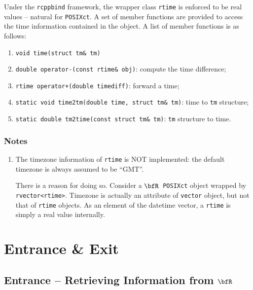 \documentclass{article}
\newcommand{\R}{$\bfR$}
\begin{document}
Under the \texttt{rcppbind} framework, the wrapper class
\texttt{rtime} is enforced to be real values -- natural for
\texttt{POSIXct}. A set of member functions are provided to
access the time information contained in the object. A list
of member functions is as follows:
\begin{enumerate}
  \item \texttt{void time(struct tm\& tm)} 
  \item \texttt{double operator-(const rtime\& obj)}: compute the time difference;
  \item \texttt{rtime operator+(double timediff)}: forward a time;
  \item \texttt{static void time2tm(double time, struct tm\&
    tm)}: time to \texttt{tm} structure;
  \item \texttt{static double tm2time(const struct tm\& tm)}:
    \texttt{tm} structure to time.
\end{enumerate}

\subsubsection*{Notes}
\begin{enumerate}
  \item The timezone information of \texttt{rtime} is NOT
    implemented: the default timezone is always assumed to be
    ``GMT''.
    
    There is a reason for doing so. Consider a \R\
    \texttt{POSIXct} object wrapped by
    \texttt{rvector<rtime>}. Timezone is actually an
    attribute of \texttt{vector} object, but not that of
    \texttt{rtime} objects. As an element of the datetime
    vector, a \texttt{rtime} is simply a real value
    internally.
\end{enumerate}

\section{Entrance \& Exit}\label{sec:entrance-exit}

\subsection{Entrance -- Retrieving Information from \R}
\end{document}

